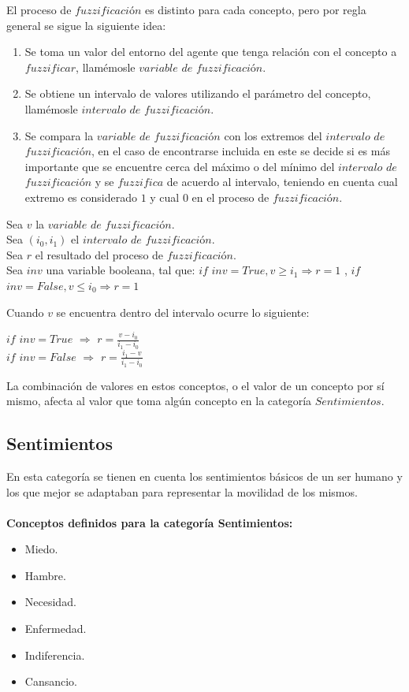 El proceso de $fuzzificaci$ó$n$ es distinto para cada concepto, pero por regla general se sigue la siguiente idea:\\
\begin{enumerate}
    \item Se toma un valor del entorno del agente que tenga relación con el concepto a $fuzzificar$, llamémosle $variable$ $de$ $fuzzificaci$ó$n$.
    \item Se obtiene un intervalo de valores utilizando el parámetro del concepto, llamémosle $intervalo$ $de$ $fuzzificaci$ó$n$.
    \item Se compara la $variable$ $de$ $fuzzificaci$ó$n$ con los extremos del $intervalo$ $de$ $fuzzificaci$ó$n$, en el caso de encontrarse incluida en este se decide si es más importante que se encuentre cerca del máximo o del mínimo del $intervalo$ $de$ $fuzzificaci$ó$n$ y se $fuzzifica$ de acuerdo al intervalo, teniendo en cuenta cual extremo es considerado $1$ y cual $0$ en el proceso de $fuzzificaci$ó$n$.
\end{enumerate}

\begin{center}
    Sea $v$ la $variable$ $de$ $fuzzificaci$ó$n$.\\
    Sea $(i_0, i_1)$ el $intervalo$ $de$ $fuzzificaci$ó$n$.\\
    Sea $r$ el resultado del proceso de $fuzzificaci$ó$n$.\\
    Sea $inv$ una variable booleana, tal que: $if$ $inv = True, v \geq i_1 \Rightarrow r = 1$ , $if$ $inv = False, v \leq i_0 \Rightarrow r = 1$\\
\end{center}
    Cuando $v$ se encuentra dentro del intervalo ocurre lo siguiente:
\begin{center}
    $if$ $inv = True$ $\Rightarrow$ $r = \frac{v - i_0}{i_1 - i_0}$\\
    $if$ $inv = False$ $\Rightarrow$ $r = \frac{i_1 - v}{i_1 - i_0}$
\end{center}

La combinación de valores en estos conceptos, o el valor de un concepto por sí mismo, afecta al valor que toma algún
concepto en la categoría $Sentimientos$.

\subsection{Sentimientos}
En esta categoría se tienen en cuenta los sentimientos básicos de un ser humano y los que mejor se adaptaban para
representar la movilidad de los mismos.\\
\\
\textbf{Conceptos definidos para la categoría Sentimientos:}
\begin{itemize}
    \item Miedo.
    \item Hambre.
    \item Necesidad.
    \item Enfermedad.
    \item Indiferencia.
    \item Cansancio.
\end{itemize}

